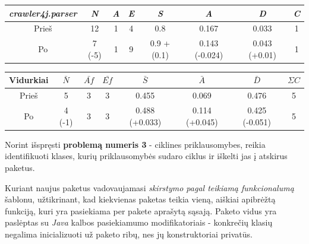 \begin{center}
    \begin{tabular}{|c|c|c|c|c|c|c|c|}
        \hline
        \textit{crawler4j.parser} & \textit{N} & \textit{A} & \textit{E} & \textit{S} & \textit{A} & \textit{D} & \textit{C} \\ [0.5ex]
        \hline\hline
        Prieš & 12 & 1 & 4 & 0.8 & 0.167 & 0.033 & 1 \\
        \hline
        Po & \cellcolor{green!25} 7 (-5) & 1 & 9 & \cellcolor{red!25} 0.9 + (0.1) & \cellcolor{red!25} 0.143 (-0.024) & \cellcolor{red!25} 0.043 (+0.01) & 1 \\
        \hline
    \end{tabular}
    \begin{tabular}{|c|c|c|c|c|c|c|c|}
        \hline
        Vidurkiai & $\bar{N}$ & $\bar{Af}$ & $\bar{Ef}$ & $\bar{S}$ & $\bar{A}$ & $\bar{D}$ & $\Sigma C$ \\ [0.5ex]
        \hline\hline
        Prieš & 5 & 3 & 3 & 0.455 & 0.069 & 0.476 & 5\\
        \hline
        Po & \cellcolor{green!25}  4 (-1) & 3 & 3 & \cellcolor{red!25} 0.488 (+0.033) & \cellcolor{green!25} 0.114 (+0.045) & \cellcolor{green!25} 0.425 (-0.051) & 5 \\
        \hline
    \end{tabular}
\end{center}
Norint išspręsti \textbf{problemą numeris 3} - ciklines priklausomybes, reikia identifikuoti klases, kurių priklausomybės
sudaro ciklus ir iškelti jas į atskirus paketus.

Kuriant naujus paketus vadovaujamasi \textit{skirstymo pagal teikiamą funkcionalumą} šablonu, užtikrinant, kad kiekvienas
paketas teikia vieną, aiškiai apibrėžtą funkciją, kuri yra pasiekiama per pakete aprašytą sąsają.
Paketo vidus yra paslėptas su \textit{Java} kalbos pasiekiamumo modifikatoriais - konkrečių klasių negalima inicializuoti už paketo ribų,
nes jų konstruktoriai privatūs.

